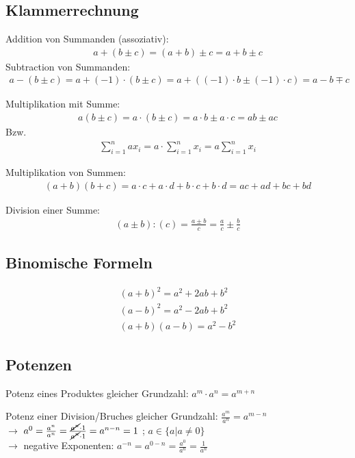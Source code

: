 \pagebreak
\subsection{Klammerrechnung}

Addition von Summanden (assoziativ):
\begin{align*}
 a + (b \pm c) = (a + b) \pm c = a + b \pm c 
\end{align*}
Subtraction von Summanden:
\begin{align*}
 a - (b \pm c) = a + (-1) \cdot  (b \pm c) = a + (  (-1) \cdot  b \pm  (-1) \cdot c)  =  a - b \mp c
\end{align*}


Multiplikation mit Summe:
\begin{align*}
 a (b \pm c) =  a \cdot (b \pm c) = a \cdot b \pm a \cdot c = ab \pm ac
\end{align*}
Bzw.
\begin{align*} 
 \sum_{i=1}^n ax_{i}  = a \cdot  \sum_{i=1}^n x_{i} = a  \sum_{i=1}^n x_{i}
 \end{align*}


Multiplikation von Summen:
\begin{align*}
 (a+b)(b+c) = a \cdot c +a \cdot d +b \cdot c +b \cdot d = ac +ad +bc +bd 
\end{align*}

Division einer Summe:
\begin{align*}
 (a \pm b):(c) = \frac{a \pm b}{c} = \frac{a}{c} \pm  \frac{b}{c} 
\end{align*}

\subsection{Binomische Formeln}
\begin{align*}
(a+b)^ 2 = a^ 2 + 2ab + b^2\\
(a-b)^ 2 =  a^ 2 - 2ab + b^2 \\
(a+b)(a-b) = a^ 2 - b^2
\end{align*}
 

%


\subsection{Potenzen}
Potenz eines Produktes gleicher Grundzahl: 
$a^m \cdot a^n = a^{m+n}$

Potenz einer Division/Bruches gleicher Grundzahl: $ \frac{a^m}{a^n} = a^{m-n}$ \\
$\longrightarrow$ $ a^0 =  \frac{a^n}{a^n} =   \frac{ \cancel{a^n} \cdot 1}{ \cancel{a^n} \cdot 1} = a^{n-n}  = 1$  ; $a \in \{a| a \neq 0\}$ \\
$\longrightarrow$ negative Exponenten: $ a^{-n} =  a^{0-n} =  \frac{a^0}{a^n}  =  \frac{1}{a^n} $ \\

